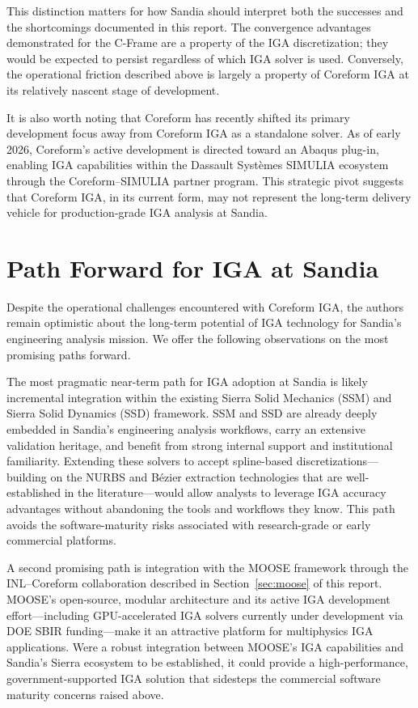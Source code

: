 \documentclass[12pt,report,justified]{SANDreport}
\begin{document}
This distinction matters for how Sandia should interpret both the successes and the
shortcomings documented in this report.  The convergence advantages demonstrated for the
C-Frame are a property of the IGA discretization; they would be expected to persist
regardless of which IGA solver is used.  Conversely, the operational
friction described above is largely a property of Coreform IGA at its relatively nascent  stage of
development.

It is also worth noting that Coreform has recently shifted its primary development focus
away from Coreform IGA as a standalone solver.  As of early 2026, Coreform's active
development is directed toward an Abaqus plug-in, enabling IGA capabilities within the
Dassault Syst\`{e}mes SIMULIA ecosystem through the Coreform--SIMULIA partner program.
This strategic pivot suggests that Coreform IGA, in its current form, may not represent
the long-term delivery vehicle for production-grade IGA analysis at Sandia.

\section{Path Forward for IGA at Sandia}

Despite the operational challenges encountered with Coreform IGA, the authors remain
optimistic about the long-term potential of IGA technology for Sandia's engineering
analysis mission.  We offer the following observations on the most promising paths
forward.

The most pragmatic near-term path for IGA adoption at Sandia is likely incremental
integration within the existing Sierra Solid Mechanics (SSM) and Sierra Solid Dynamics
(SSD) framework.  SSM and SSD are already deeply embedded in Sandia's engineering
analysis workflows, carry an extensive validation heritage, and benefit from strong
internal support and institutional familiarity.  Extending these solvers to accept
spline-based discretizations---building on the NURBS and B\'{e}zier extraction
technologies that are well-established in the literature---would allow analysts to
leverage IGA accuracy advantages without abandoning the tools and workflows they know.
This path avoids the software-maturity risks associated with research-grade or early
commercial platforms.

A second promising path is integration with the MOOSE framework through the
INL--Coreform collaboration described in Section~\ref{sec:moose} of this report.  MOOSE's
open-source, modular architecture and its active IGA development effort---including
GPU-accelerated IGA solvers currently under development via DOE SBIR funding---make it
an attractive platform for multiphysics IGA applications.  Were a robust integration between
MOOSE's IGA capabilities and Sandia's Sierra ecosystem to be established, it could
provide a high-performance, government-supported IGA solution that sidesteps the
commercial software maturity concerns raised above.
\end{document}
